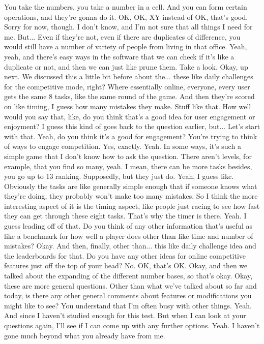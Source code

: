 \documentclass{article}
\begin{document}
You take the numbers, you take a number in a cell.
And you can form certain operations, and they're gonna do it. OK, OK, XY instead of OK, that's good.
Sorry for now, though.
I don't know, and I'm not sure that all things I need for me.
But...
Even if they're not, even if there are duplicates of difference, you would still have a number of variety of people from living in that office. Yeah, yeah, and there's easy ways in the software that we can check if it's like a duplicate or not, and then we can just like prune them.
Take a look.
Okay, up next.
We discussed this a little bit before about the...
these like daily challenges for the competitive mode, right? Where essentially online, everyone, every user gets the same 8 tasks, like the same round of the game. And then they're scored on like timing, I guess how many mistakes they make.
Stuff like that.
How well would you say that, like, do you think that's a good idea for user engagement or enjoyment?
I guess this kind of goes back to the question earlier, but...
Let's start with that. Yeah, do you think it's a good for engagement?
You're trying to think of ways to engage competition. Yes, exactly. Yeah.
In some ways, it's such a simple game that I don't know how to ask the question.
There aren't levels, for example, that you find so many, yeah.
I mean, there can be more tasks besides, you go up to 13 ranking.
Supposedly, but they just do.
Yeah, I guess like.
Obviously the tasks are like generally simple enough that if someone knows what they're doing, they probably won't make too many mistakes. So I think the more interesting aspect of it is the timing aspect, like people just racing to see how fast they can get through these eight tasks. That's why the timer is there. Yeah.
I guess leading off of that.
Do you think of any other information that's useful as like a benchmark for how well a player does other than like time and number of mistakes?
Okay.
And then, finally, other than...
this like daily challenge idea and the leaderboards for that. Do you have any other ideas for online competitive features just off the top of your head?
No.
OK, that's OK.
Okay, and then we talked about the expanding of the different number bases, so that's okay.
Okay, these are more general questions. Other than what we've talked about so far and today, is there any other general comments about features or modifications you might like to see?
You understand that I'm often busy with other things. Yeah. And since I haven't studied enough for this test. But when I can look at your questions again, I'll see if I can come up with any further options. Yeah. I haven't gone much beyond what you already have from me.
\end{document}
